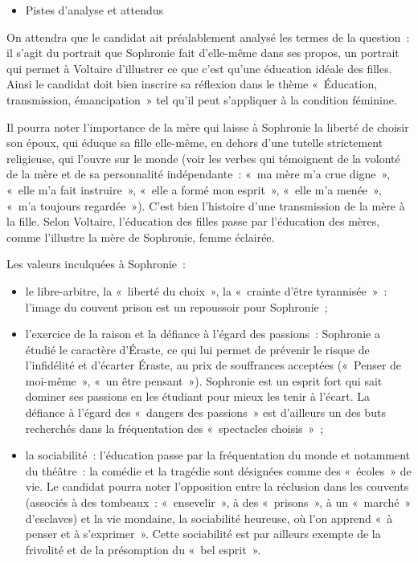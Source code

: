 {\begin{itemize}[label=\textbullet]
\item Pistes d'analyse et attendus
\end{itemize}

On attendra que le candidat ait préalablement analysé les termes de la question~: il
s'agit du portrait que Sophronie fait d'elle-même dans ses propos, un portrait qui
permet à Voltaire d'illustrer ce que c'est qu'une éducation idéale des filles. Ainsi le
candidat doit bien inscrire sa réflexion dans le thème «~Éducation, transmission,
émancipation~» tel qu'il peut s'appliquer à la condition féminine.

Il pourra noter l'importance de la mère qui laisse à Sophronie la liberté de choisir son
époux, qui éduque sa fille elle-même, en dehors d'une tutelle strictement religieuse,
qui l'ouvre sur le monde (voir les verbes qui témoignent de la volonté de la mère et de
sa personnalité indépendante~: «~ma mère m'a crue digne~», «~elle m'a fait instruire~»,
«~elle a formé mon esprit~», «~elle m'a menée~», «~m'a toujours regardée~»). C'est bien
l'histoire d'une transmission de la mère à la fille. Selon Voltaire, l'éducation des filles
passe par l'éducation des mères, comme l'illustre la mère de Sophronie, femme
éclairée.

Les valeurs inculquées à Sophronie~:

\begin{itemize}
\item le libre-arbitre, la «~liberté du choix~», la «~crainte d'être tyrannisée~»~: l'image du
couvent prison est un repoussoir pour Sophronie~;
\item l'exercice de la raison et la défiance à l'égard des passions~: Sophronie a étudié le
caractère d'Éraste, ce qui lui permet de prévenir le risque de l'infidélité et d'écarter
Éraste, au prix de souffrances acceptées («~Penser de moi-même~», «~un être
pensant~»). Sophronie est un esprit fort qui sait dominer ses passions en les étudiant
pour mieux les tenir à l'écart. La défiance à l'égard des «~dangers des passions~» est
d'ailleurs un des buts recherchés dans la fréquentation des «~spectacles choisis~»~;
\item la sociabilité~: l'éducation passe par la fréquentation du monde et notamment du
théâtre~: la comédie et la tragédie sont désignées comme des «~écoles~» de vie. Le
candidat pourra noter l'opposition entre la réclusion dans les couvents (associés à des
tombeaux~: «~ensevelir~», à des «~prisons~», à un «~marché~» d'esclaves) et la vie
mondaine, la sociabilité heureuse, où l'on apprend «~à penser et à s'exprimer~». Cette
sociabilité est par ailleurs exempte de la frivolité et de la présomption du «~bel esprit~».
\end{itemize}

}
